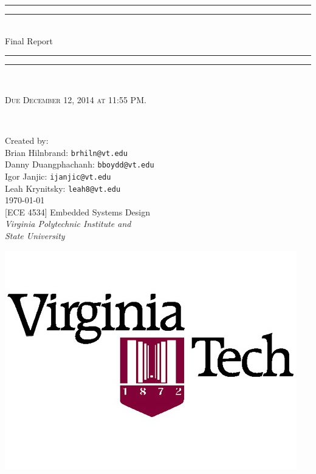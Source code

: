 
\begin{titlepage}

\centering
\vspace*{\baselineskip}

\rule{\textwidth}{1.6pt}\vspace*{-\baselineskip}\vspace*{2pt}
\rule{\textwidth}{0.4pt}\\[\baselineskip]

{\LARGE Final Report\\[0.3\baselineskip]}

\rule{\textwidth}{0.4pt}\vspace*{-\baselineskip}\vspace{3.2pt}
\rule{\textwidth}{1.6pt}\\[\baselineskip]

\wl

\scshape Due December 12, 2014 at 11:55 PM.
{\small 
\\[\baselineskip]\par}

\vfill

Created by:\\[0.2\baselineskip]
{Brian Hilnbrand:     \texttt{brhiln@vt.edu}}\\[0.2\baselineskip]
{Danny Duangphachanh: \texttt{bboydd@vt.edu}}\\[0.2\baselineskip]
{Igor Janjic:         \texttt{ijanjic@vt.edu}}\\[0.2\baselineskip]
{Leah Krynitsky:      \texttt{leah8@vt.edu}}\\[0.4\baselineskip]
{\small \today}\\[0.8\baselineskip]
{\small [ECE 4534] Embedded Systems Design}\\[0.2\baselineskip]
{\small\itshape Virginia Polytechnic Institute and\\ State University}\\[0.2\baselineskip]

\begin{center}
	\includegraphics[scale=0.35]{Images/Logo}
\end{center}

\end{titlepage}
